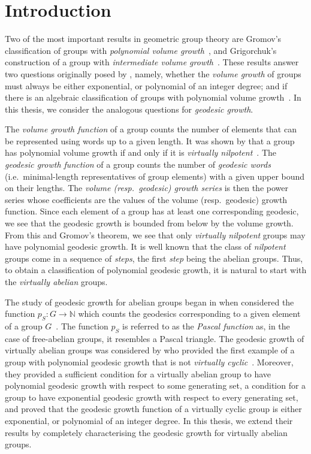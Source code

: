 \chapter{Introduction}\label{chapter:introduction}

Two of the most important results in geometric group theory are Gromov's classification of groups with \emph{polynomial volume growth}~\cite{gromov1981}, and Grigorchuk's construction of a group with \emph{intermediate volume growth}~\cite{grigorchuk1983}.
These results answer two questions originally posed by \citeauthor{milnor1968a}, namely, whether the \emph{volume growth} of groups must always be either exponential, or polynomial of an integer degree; and if there is an algebraic classification of groups with polynomial volume growth~\cite{milnor1968a}.
In this thesis, we consider the analogous questions for \emph{geodesic growth}.

The \emph{volume growth function} of a group counts the number of elements that can be represented using words up to a given length.
It was shown by \citeauthor{gromov1981} that a group has polynomial volume growth if and only if it is \emph{virtually nilpotent}~\cite{gromov1981}.
The \emph{geodesic growth function} of a group counts the number of \emph{geodesic words} (i.e.\ minimal-length representatives of group elements) with a given upper bound on their lengths.
The \emph{volume (resp.~geodesic) growth series} is then the power series whose coefficients are the values of the volume (resp.~geodesic) growth function.
Since each element of a group has at least one corresponding geodesic, we see that the geodesic growth is bounded from below by the volume growth.
From this and Gromov's theorem, we see that only \emph{virtually nilpotent} groups may have polynomial geodesic growth.
It is well known that the class of \emph{nilpotent} groups come in a sequence of \textit{steps}, the first \textit{step} being the abelian groups.
Thus, to obtain a classification of polynomial geodesic growth, it is natural to start with the \emph{virtually abelian} groups.

The study of geodesic growth for abelian groups began in \citeyear{shapiro1997} when \citeauthor{shapiro1997} considered the function $p_S\colon G \to \mathbb{N}$ which counts the geodesics corresponding to a given element of a group $G$~\cite{shapiro1997}.
The function $p_S$ is referred to as the \emph{Pascal function} as, in the case of free-abelian groups, it resembles a Pascal triangle.
The geodesic growth of virtually abelian groups was considered by \citeauthor{bridson2012} who provided the first example of a group with polynomial geodesic growth that is not \emph{virtually cyclic}~\cite{bridson2012}.
Moreover, they provided a sufficient condition for a virtually abelian group to have polynomial geodesic growth with respect to some generating set, a condition for a group to have exponential geodesic growth with respect to every generating set, and proved that the geodesic growth function of a virtually cyclic group is either exponential, or polynomial of an integer degree.
In this thesis, we extend their results by completely characterising the geodesic growth for virtually abelian groups.

